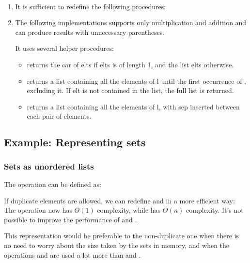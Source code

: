 \begin{exe}[2.58]
    \ \vspace{-20pt}
    \begin{enumerate}
        \item It is sufficient to redefine the following procedures:
        \item The following implementations supports only multiplication and 
            addition and can produce results with unnecessary parentheses.

            It uses several helper procedures:
            \begin{itemize}
                \item {} returns the car of elts if elts 
                    is of length 1, and the list elts otherwise.
                \item {} returns a list containing all 
                    the elements of l until the first occurrence of , 
                    excluding it. If elt is not contained in the list, the full 
                    list is returned.
                \item {} returns a list containing all 
                    the elements of l, with sep inserted between each pair of 
                    elements.
            \end{itemize}
    \end{enumerate}
\end{exe}

\subsection{Example: Representing sets}
\label{2.3.3}

\subsubsection{Sets as unordered lists}

\begin{exe}[2.59]
    The  operation can be defined as:
\end{exe}

\begin{exe}[2.60]
    If duplicate elements are allowed, we can redefine  and 
     in a more efficient way:
    The operation  now has $\Theta(1)$ complexity, while 
     has $\Theta(n)$ complexity. It’s not possible to improve 
    the performance of  and .

    This representation would be preferable to the non-duplicate one when there 
    is no need to worry about the size taken by the sets in memory, and when the 
    operations  and  are used a lot more than 
     and .
\end{exe}

